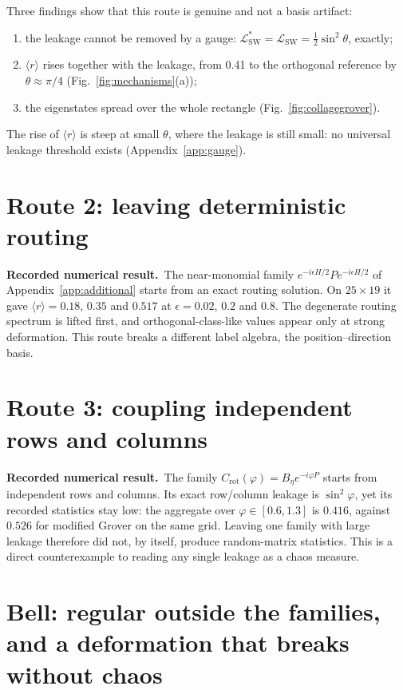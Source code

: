 \documentclass[11pt,a4paper,oneside]{report}
\newcommand{\sw}{\mathrm{SW}}
\newcommand{\recorded}{\textbf{Recorded numerical result.}\ }
\numberwithin{equation}{chapter}
\begin{document}
Three findings show that this route is genuine and not a basis artifact:
\begin{enumerate}
\item the leakage cannot be removed by a gauge:
\(\mathcal L^*_{\sw}=\mathcal L_{\sw}=\tfrac12\sin^2\theta\), exactly;
\item \(\langle r\rangle\) rises together with the leakage, from 0.41 to
the orthogonal reference by \(\theta\approx\pi/4\)
(Fig.~\ref{fig:mechanisms}(a));
\item the eigenstates spread over the whole rectangle
(Fig.~\ref{fig:collagegrover}).
\end{enumerate}
The rise of \(\langle r\rangle\) is steep at small \(\theta\), where the
leakage is still small: no universal leakage threshold exists
(Appendix~\ref{app:gauge}).

\section{Route 2: leaving deterministic routing}

\recorded The near-monomial family
\(e^{-i\epsilon H/2}Pe^{-i\epsilon H/2}\) of Appendix~\ref{app:additional}
starts from an exact routing solution. On \(25\times19\) it gave
\(\langle r\rangle=0.18\), \(0.35\) and \(0.517\) at
\(\epsilon=0.02\), \(0.2\) and \(0.8\). The degenerate routing spectrum
is lifted first, and orthogonal-class-like values appear only at strong
deformation. This route breaks a different label algebra, the
position--direction basis.

\section{Route 3: coupling independent rows and columns}

\recorded The family \(C_{\mathrm{rot}}(\varphi)=B_\eta e^{-i\varphi P}\)
starts from independent rows and columns. Its exact row/column leakage
is \(\sin^2\varphi\), yet its recorded statistics stay low: the aggregate
over \(\varphi\in[0.6,1.3]\) is \(0.416\), against \(0.526\) for modified
Grover on the same grid. Leaving one family with large leakage therefore
did not, by itself, produce random-matrix statistics. This is a direct
counterexample to reading any single leakage as a chaos measure.

\section{Bell: regular outside the families, and a deformation that breaks without chaos}
\end{document}
